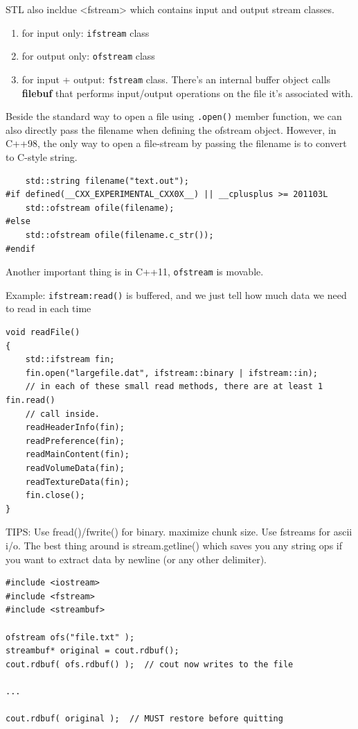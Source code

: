 STL also incldue <fstream> which contains input and output stream classes.
\begin{enumerate}
  \item for input only: \verb!ifstream! class
  \item for output only: \verb!ofstream! class
  \item for input + output: \verb!fstream! class. There's an internal buffer
  object calls {\bf filebuf} that performs input/output  operations on the file
  it's associated with.   
\end{enumerate}
Beside the standard way to open a file using \verb!.open()! member function, we
can also directly pass the filename when defining the ofstream object.
However, in C++98, the only way to open a file-stream by passing the filename is
to convert to C-style string.
\begin{verbatim}
	std::string filename("text.out");
#if defined(__CXX_EXPERIMENTAL_CXX0X__) || __cplusplus >= 201103L
	std::ofstream ofile(filename);
#else
	std::ofstream ofile(filename.c_str());
#endif	
\end{verbatim}

Another important thing is in C++11, \verb!ofstream! is movable. 

Example: \verb!ifstream:read()! is buffered, and we just tell how much data we
need to read in each time

{\small \begin{verbatim} 
void readFile()
{
    std::ifstream fin;
    fin.open("largefile.dat", ifstream::binary | ifstream::in);
    // in each of these small read methods, there are at least 1 fin.read()
    // call inside.
    readHeaderInfo(fin);
    readPreference(fin);
    readMainContent(fin);
    readVolumeData(fin);
    readTextureData(fin);
    fin.close();
}
\end{verbatim}}

TIPS: Use fread()/fwrite() for binary. maximize chunk size. Use fstreams for
ascii i/o. The best thing around is stream.getline() which saves you any string
ops if you want to extract data by newline (or any other delimiter). 

{\small \begin{verbatim} 
#include <iostream>
#include <fstream>
#include <streambuf>

ofstream ofs("file.txt" );
streambuf* original = cout.rdbuf();
cout.rdbuf( ofs.rdbuf() );  // cout now writes to the file

...

cout.rdbuf( original );  // MUST restore before quitting
\end{verbatim}}

